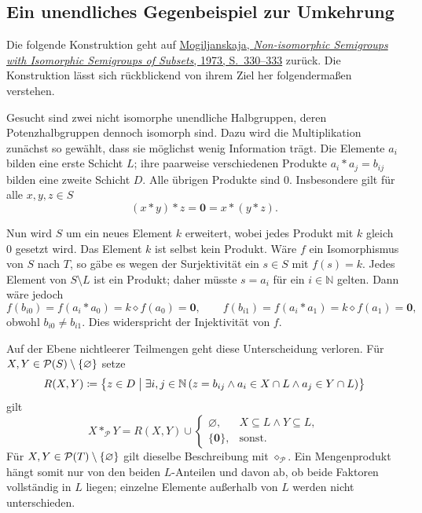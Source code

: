\documentclass[main.tex]{subfiles}
\begin{document}
\newcommand{\MogStar}{\mathbin{\ast}}
\newcommand{\MogDiamond}{\mathbin{\diamond}}

\subsection{Ein unendliches Gegenbeispiel zur Umkehrung}

Die folgende Konstruktion geht auf
\href{https://doi.org/10.1007/BF02389140}%
  {Mogiljanskaja, \emph{Non-isomorphic Semigroups with Isomorphic
  Semigroups of Subsets}, 1973, S.~330--333}
zurück. Die Konstruktion lässt sich rückblickend von ihrem Ziel her
folgendermaßen verstehen.

\begin{remark}
Gesucht sind zwei nicht isomorphe unendliche Halbgruppen, deren
Potenzhalbgruppen dennoch isomorph sind. Dazu wird die Multiplikation zunächst
so gewählt, dass sie möglichst wenig Information trägt. Die Elemente \(a_i\)
bilden eine erste Schicht \(L\); ihre paarweise verschiedenen Produkte
\(a_i\MogStar a_j=b_{ij}\) bilden eine zweite Schicht \(D\). Alle übrigen
Produkte sind \(0\). Insbesondere gilt für alle \(x,y,z\in S\)
\[
  (x\MogStar y)\MogStar z
  =\mathbf0
  =x\MogStar(y\MogStar z).
\]

Nun wird \(S\) um ein neues Element \(k\) erweitert, wobei jedes Produkt mit
\(k\) gleich \(0\) gesetzt wird. Das Element \(k\) ist selbst kein Produkt.
Wäre \(f\) ein Isomorphismus von \(S\) nach \(T\), so gäbe es wegen der
Surjektivität ein \(s\in S\) mit \(f(s)=k\). Jedes Element von
\(S\setminus L\) ist ein Produkt; daher müsste \(s=a_i\) für ein
\(i\in\mathbb N\) gelten. Dann
wäre jedoch
\[
  f(b_{i0})=f(a_i\MogStar a_0)
    =k\MogDiamond f(a_0)=\mathbf0,
  \qquad
  f(b_{i1})=f(a_i\MogStar a_1)
    =k\MogDiamond f(a_1)=\mathbf0,
\]
obwohl \(b_{i0}\neq b_{i1}\). Dies widerspricht der Injektivität von \(f\).

Auf der Ebene nichtleerer Teilmengen geht diese Unterscheidung verloren. Für
\(X,Y\in\mathcal{P}(S)\setminus\{\varnothing\}\) setze
\[
  R(X,Y)\coloneqq
  \bigl\{z\in D\bigm|
    \exists i,j\in\mathbb N\,
      (z=b_{ij}\land a_i\in X\cap L\land a_j\in Y\cap L)\bigr\}
\]
gilt
\[
  X\MogStar_{\mathcal P}Y
  =R(X,Y)\cup
  \begin{cases}
    \varnothing,&X\subseteq L\land Y\subseteq L,\\
    \{\mathbf0\},&\text{sonst}.
  \end{cases}
\]
Für \(X,Y\in\mathcal{P}(T)\setminus\{\varnothing\}\) gilt dieselbe Beschreibung mit
\(\MogDiamond_{\mathcal P}\). Ein Mengenprodukt hängt somit nur von den
beiden \(L\)-Anteilen und davon ab, ob beide Faktoren vollständig in \(L\)
liegen; einzelne Elemente außerhalb von \(L\) werden nicht unterschieden.


\end{remark}
\end{document}
